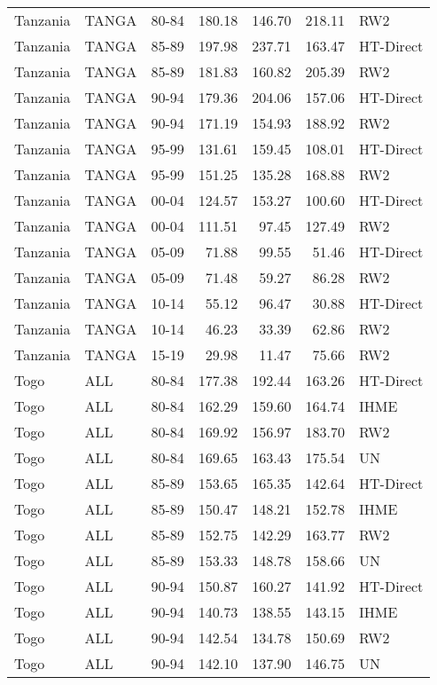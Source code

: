 \begin{longtable}{lllrrrl}
  Tanzania & TANGA & 80-84 & 180.18 & 146.70 & 218.11 & RW2 \\ 
  Tanzania & TANGA & 85-89 & 197.98 & 237.71 & 163.47 & HT-Direct \\ 
  Tanzania & TANGA & 85-89 & 181.83 & 160.82 & 205.39 & RW2 \\ 
  Tanzania & TANGA & 90-94 & 179.36 & 204.06 & 157.06 & HT-Direct \\ 
  Tanzania & TANGA & 90-94 & 171.19 & 154.93 & 188.92 & RW2 \\ 
  Tanzania & TANGA & 95-99 & 131.61 & 159.45 & 108.01 & HT-Direct \\ 
  Tanzania & TANGA & 95-99 & 151.25 & 135.28 & 168.88 & RW2 \\ 
  Tanzania & TANGA & 00-04 & 124.57 & 153.27 & 100.60 & HT-Direct \\ 
  Tanzania & TANGA & 00-04 & 111.51 & 97.45 & 127.49 & RW2 \\ 
  Tanzania & TANGA & 05-09 & 71.88 & 99.55 & 51.46 & HT-Direct \\ 
  Tanzania & TANGA & 05-09 & 71.48 & 59.27 & 86.28 & RW2 \\ 
  Tanzania & TANGA & 10-14 & 55.12 & 96.47 & 30.88 & HT-Direct \\ 
  Tanzania & TANGA & 10-14 & 46.23 & 33.39 & 62.86 & RW2 \\ 
  Tanzania & TANGA & 15-19 & 29.98 & 11.47 & 75.66 & RW2 \\ 
  Togo & ALL & 80-84 & 177.38 & 192.44 & 163.26 & HT-Direct \\ 
  Togo & ALL & 80-84 & 162.29 & 159.60 & 164.74 & IHME \\ 
  Togo & ALL & 80-84 & 169.92 & 156.97 & 183.70 & RW2 \\ 
  Togo & ALL & 80-84 & 169.65 & 163.43 & 175.54 & UN \\ 
  Togo & ALL & 85-89 & 153.65 & 165.35 & 142.64 & HT-Direct \\ 
  Togo & ALL & 85-89 & 150.47 & 148.21 & 152.78 & IHME \\ 
  Togo & ALL & 85-89 & 152.75 & 142.29 & 163.77 & RW2 \\ 
  Togo & ALL & 85-89 & 153.33 & 148.78 & 158.66 & UN \\ 
  Togo & ALL & 90-94 & 150.87 & 160.27 & 141.92 & HT-Direct \\ 
  Togo & ALL & 90-94 & 140.73 & 138.55 & 143.15 & IHME \\ 
  Togo & ALL & 90-94 & 142.54 & 134.78 & 150.69 & RW2 \\ 
  Togo & ALL & 90-94 & 142.10 & 137.90 & 146.75 & UN \\ 

\end{longtable}
